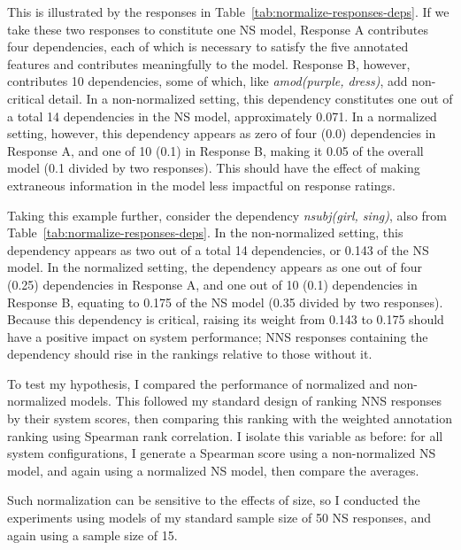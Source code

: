 This is illustrated by the responses in Table~\ref{tab:normalize-responses-deps}. If we take these two responses to constitute one NS model, Response A contributes four dependencies, each of which is necessary to satisfy the five annotated features and contributes meaningfully to the model. Response B, however, contributes 10 dependencies, some of which, like \textit{amod(purple, dress)}, add non-critical detail. In a non-normalized setting, this dependency constitutes one out of a total 14 dependencies in the NS model, approximately 0.071. In a normalized setting, however, this dependency appears as zero of four (0.0) dependencies in Response A, and one of 10 (0.1) in Response B, making it 0.05 of the overall model (0.1 divided by two responses). This should have the effect of making extraneous information in the model less impactful on response ratings.

Taking this example further, consider the dependency \textit{nsubj(girl, sing)}, also from Table~\ref{tab:normalize-responses-deps}. In the non-normalized setting, this dependency appears as two out of a total 14 dependencies, or 0.143 of the NS model. In the normalized setting, the dependency appears as one out of four (0.25) dependencies in Response A, and one out of 10 (0.1) dependencies in Response B, equating to 0.175 of the NS model (0.35 divided by two responses). Because this dependency is critical, raising its weight from 0.143 to 0.175 should have a positive impact on system performance; NNS responses containing the dependency should rise in the rankings relative to those without it. 

To test my hypothesis, I compared the performance of normalized and non-normalized models. This followed my standard design of ranking NNS responses by their system scores, then comparing this ranking with the weighted annotation ranking using Spearman rank correlation. I isolate this variable as before: for all system configurations, I generate a Spearman score using a non-normalized NS model, and again using a normalized NS model, then compare the averages.

Such normalization can be sensitive to the effects of size, so I conducted the  experiments using models of my standard sample size of 50 NS responses, and again using a sample size of 15.


